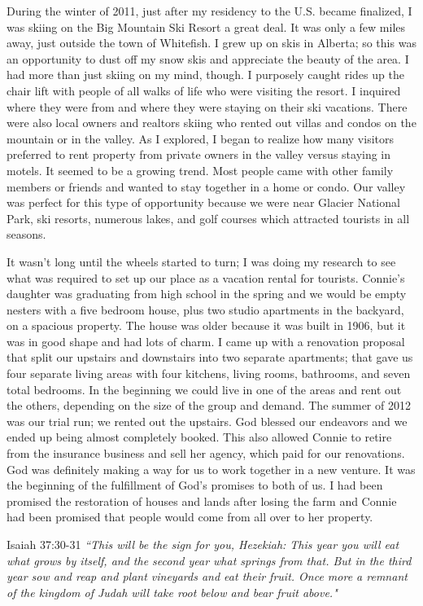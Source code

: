 \documentclass[oneside,12pt]{book}
\begin{document}
During the winter of 2011, just after my residency to the U.S. became finalized, I was skiing on the Big Mountain Ski Resort a great deal. It was only a few miles away, just outside the town of Whitefish. I grew up on skis in Alberta; so this was an opportunity to dust off my snow skis and appreciate the beauty of the area. I had more than just skiing on my mind, though. I purposely caught rides up the chair lift with people of all walks of life who were visiting the resort. I inquired where they were from and where they were staying on their ski vacations. There were also local owners and realtors skiing who rented out villas and condos on the mountain or in the valley. As I explored, I began to realize how many visitors preferred to rent property from private owners in the valley versus staying in motels. It seemed to be a growing trend. Most people came with other family members or friends and wanted to stay together in a home or condo. Our valley was perfect for this type of opportunity because we were near Glacier National Park, ski resorts, numerous lakes, and golf courses which attracted tourists in all seasons.

It wasn't long until the wheels started to turn; I was doing my research to see what was required to set up our place as a vacation rental for tourists. Connie's daughter was graduating from high school in the spring and we would be empty nesters with a five bedroom house, plus two studio apartments in the backyard, on a spacious property. The house was older because it was built in 1906, but it was in good shape and had lots of charm. I came up with a renovation proposal that split our upstairs and downstairs into two separate apartments; that gave us four separate living areas with four kitchens, living rooms, bathrooms, and seven total bedrooms. In the beginning we could live in one of the areas and rent out the others, depending on the size of the group and demand. The summer of 2012 was our trial run; we rented out the upstairs. God blessed our endeavors and we ended up being almost completely booked. This also allowed Connie to retire from the insurance business and sell her agency, which paid for our renovations. God was definitely making a way for us to work together in a new venture. It was the beginning of the fulfillment of God's promises to both of us. I had been promised the restoration of houses and lands after losing the farm and Connie had been promised that people would come from all over to her property. 

Isaiah 37:30-31 \textit{``This will be the sign for you, Hezekiah: This year you will eat what grows by itself, and the second year what springs from that. But in the third year sow and reap and plant vineyards and eat their fruit. Once more a remnant of the kingdom of Judah will take root below and bear fruit above."}
\end{document}
